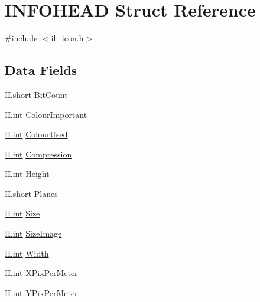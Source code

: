 \hypertarget{struct_i_n_f_o_h_e_a_d}{\section{I\-N\-F\-O\-H\-E\-A\-D Struct Reference}
\label{struct_i_n_f_o_h_e_a_d}
}


{\ttfamily \#include $<$il\-\_\-icon.\-h$>$}

\subsection*{Data Fields}
\begin{DoxyCompactItemize}
\item 
\hyperlink{il_8h_afc75ded918970afe7517d3f7f0561db3}{I\-Lshort} \hyperlink{struct_i_n_f_o_h_e_a_d_a671acfc2f87c6168433674e073126438}{Bit\-Count}
\item 
\hyperlink{il_8h_a288a97fb9e92e707a60b749d0039fafe}{I\-Lint} \hyperlink{struct_i_n_f_o_h_e_a_d_ac8f3d33e1d4f80f5e39d4e550f1bba26}{Colour\-Important}
\item 
\hyperlink{il_8h_a288a97fb9e92e707a60b749d0039fafe}{I\-Lint} \hyperlink{struct_i_n_f_o_h_e_a_d_a347a43f0b95bff3c1eb40e10c10ef21d}{Colour\-Used}
\item 
\hyperlink{il_8h_a288a97fb9e92e707a60b749d0039fafe}{I\-Lint} \hyperlink{struct_i_n_f_o_h_e_a_d_a3165fbe7a0d267bb5438cf7e2d0234f2}{Compression}
\item 
\hyperlink{il_8h_a288a97fb9e92e707a60b749d0039fafe}{I\-Lint} \hyperlink{struct_i_n_f_o_h_e_a_d_a6ab8e5a8c7842b5a57104e36b9a49f33}{Height}
\item 
\hyperlink{il_8h_afc75ded918970afe7517d3f7f0561db3}{I\-Lshort} \hyperlink{struct_i_n_f_o_h_e_a_d_ad6a16792bdb04dba10e5a46eb518ce65}{Planes}
\item 
\hyperlink{il_8h_a288a97fb9e92e707a60b749d0039fafe}{I\-Lint} \hyperlink{struct_i_n_f_o_h_e_a_d_a79baeeee1ab272b95715f56b698506c7}{Size}
\item 
\hyperlink{il_8h_a288a97fb9e92e707a60b749d0039fafe}{I\-Lint} \hyperlink{struct_i_n_f_o_h_e_a_d_a1fef46d6eb69aeffae54b289f8f8fe7f}{Size\-Image}
\item 
\hyperlink{il_8h_a288a97fb9e92e707a60b749d0039fafe}{I\-Lint} \hyperlink{struct_i_n_f_o_h_e_a_d_a0bebc214dbd5f199ad36aefd13feb6e7}{Width}
\item 
\hyperlink{il_8h_a288a97fb9e92e707a60b749d0039fafe}{I\-Lint} \hyperlink{struct_i_n_f_o_h_e_a_d_a00d081344c18ea474ecc457f9ef2fb3f}{X\-Pix\-Per\-Meter}
\item 
\hyperlink{il_8h_a288a97fb9e92e707a60b749d0039fafe}{I\-Lint} \hyperlink{struct_i_n_f_o_h_e_a_d_af4179227d1a1482a7649ce415e1a9d4d}{Y\-Pix\-Per\-Meter}
\end{DoxyCompactItemize}


